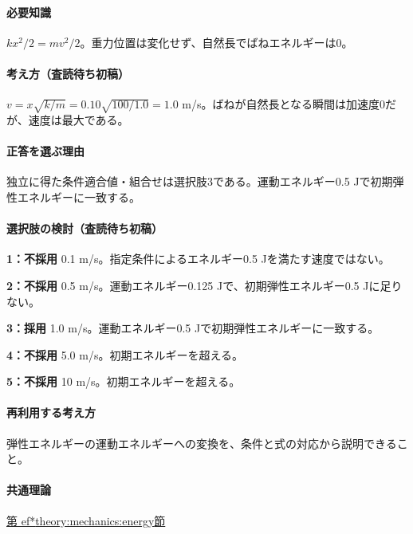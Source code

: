 \paragraph{必要知識} \(kx^2/2=mv^2/2\)。重力位置は変化せず、自然長でばねエネルギーは0。

\paragraph{考え方（査読待ち初稿）} \(v=x\sqrt{k/m}=0.10\sqrt{100/1.0}=1.0\) m/s。ばねが自然長となる瞬間は加速度0だが、速度は最大である。

\paragraph{正答を選ぶ理由} 独立に得た条件適合値・組合せは選択肢3である。運動エネルギー0.5 Jで初期弾性エネルギーに一致する。

\paragraph{選択肢の検討（査読待ち初稿）}

\noindent\textbf{1：不採用} 0.1 m/s。指定条件によるエネルギー0.5 Jを満たす速度ではない。\par

\noindent\textbf{2：不採用} 0.5 m/s。運動エネルギー0.125 Jで、初期弾性エネルギー0.5 Jに足りない。\par

\noindent\textbf{3：採用} 1.0 m/s。運動エネルギー0.5 Jで初期弾性エネルギーに一致する。\par

\noindent\textbf{4：不採用} 5.0 m/s。初期エネルギーを超える。\par

\noindent\textbf{5：不採用} 10 m/s。初期エネルギーを超える。\par

\paragraph{再利用する考え方} 弾性エネルギーの運動エネルギーへの変換を、条件と式の対応から説明できること。

\paragraph{共通理論} \hyperref[theory:mechanics:energy]{第
ef*{theory:mechanics:energy}節}

